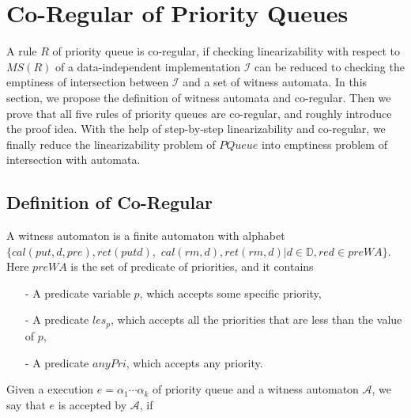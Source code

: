 \section{Co-Regular of Priority Queues}
\label{sec:co-regular of priority queues}

A rule $R$ of priority queue is co-regular, if checking linearizability with respect to $\textit{MS}(R)$ of a data-independent implementation $\mathcal{I}$ can be reduced to checking the emptiness of intersection between $\mathcal{I}$ and a set of witness automata. In this section, we propose the definition of witness automata and co-regular. Then we prove that all five rules of priority queues are co-regular, and roughly introduce the proof idea. With the help of step-by-step linearizability and co-regular, we finally reduce the linearizability problem of $\textit{PQueue}$ into emptiness problem of intersection with automata.



\subsection{Definition of Co-Regular}
\label{subsec:definition of co-regular}

A witness automaton is a finite automaton with alphabet $\{ \textit{cal}(\textit{put},d,\textit{pre}), \textit{ret}(\textit{put}d),$ $\textit{cal}(\textit{rm},d),\textit{ret}(\textit{rm},d) \vert d \in \mathbb{D},\textit{red} \in \textit{preWA} \}$. Here $\textit{preWA}$ is the set of predicate of priorities, and it contains

\begin{itemize}
\setlength{\itemsep}{0.5pt}
\item[-] A predicate variable $p$, which accepts some specific priority,

\item[-] A predicate $\textit{les}_p$, which accepts all the priorities that are less than the value of $p$,

\item[-] A predicate $\textit{anyPri}$, which accepts any priority.
\end{itemize}

Given a execution $e = \alpha_1 \cdots \alpha_k$ of priority queue and a witness automaton $\mathcal{A}$, we say that $e$ is accepted by $\mathcal{A}$, if

